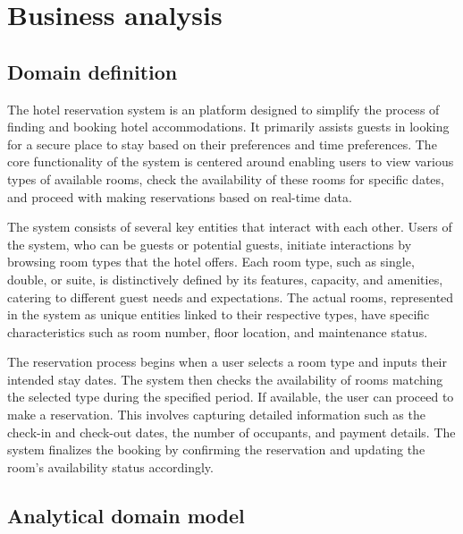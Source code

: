 \section{Business analysis}

\subsection{Domain definition}

The hotel reservation system is an platform designed to simplify the process of finding and booking hotel accommodations. It primarily assists guests in looking for a secure place to stay based on their preferences and time preferences. The core functionality of the system is centered around enabling users to view various types of available rooms, check the availability of these rooms for specific dates, and proceed with making reservations based on real-time data.

The system consists of several key entities that interact with each other. Users of the system, who can be guests or potential guests, initiate interactions by browsing room types that the hotel offers. Each room type, such as single, double, or suite, is distinctively defined by its features, capacity, and amenities, catering to different guest needs and expectations. The actual rooms, represented in the system as unique entities linked to their respective types, have specific characteristics such as room number, floor location, and maintenance status.

The reservation process begins when a user selects a room type and inputs their intended stay dates. The system then checks the availability of rooms matching the selected type during the specified period. If available, the user can proceed to make a reservation. This involves capturing detailed information such as the check-in and check-out dates, the number of occupants, and payment details. The system finalizes the booking by confirming the reservation and updating the room's availability status accordingly.

\pagebreak

\subsection{Analytical domain model}


